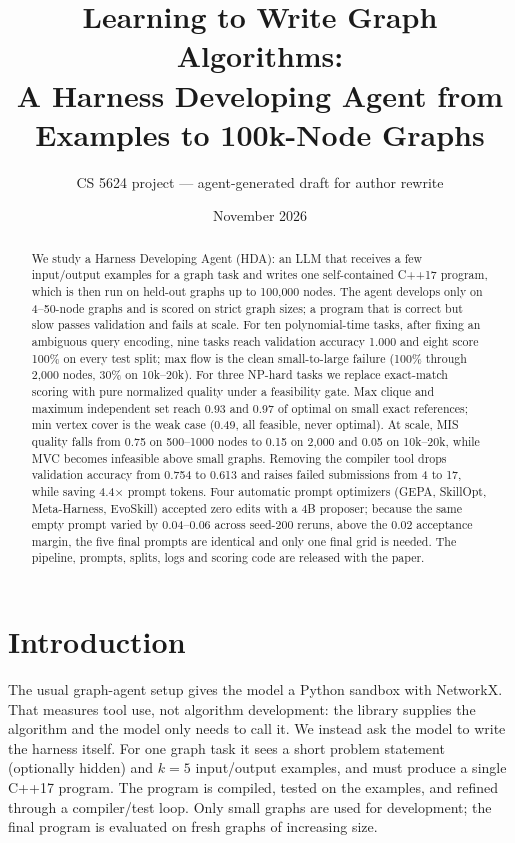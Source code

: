 \documentclass[10pt]{article}
\title{\vspace{-1.2em}Learning to Write Graph Algorithms:\\A Harness Developing Agent from Examples to 100k-Node Graphs}
\author{CS 5624 project --- agent-generated draft for author rewrite}
\date{November 2026}
\begin{document}
\maketitle
\thispagestyle{empty}

\begin{abstract}
We study a Harness Developing Agent (HDA): an LLM that receives a few
input/output examples for a graph task and writes one self-contained C++17
program, which is then run on held-out graphs up to 100{,}000 nodes. The agent
develops only on 4--50-node graphs and is scored on strict graph sizes; a
program that is correct but slow passes validation and fails at scale. For ten
polynomial-time tasks, after fixing an ambiguous query encoding, nine tasks
reach validation accuracy 1.000 and eight score 100\% on every test split; max
flow is the clean small-to-large failure (100\% through 2{,}000 nodes, 30\% on
10k--20k). For three NP-hard tasks we replace exact-match scoring with pure
normalized quality under a feasibility gate. Max clique and maximum independent
set reach 0.93 and 0.97 of optimal on small exact references; min vertex cover
is the weak case (0.49, all feasible, never optimal). At scale, MIS quality
falls from 0.75 on 500--1000 nodes to 0.15 on 2{,}000 and 0.05 on 10k--20k,
while MVC becomes infeasible above small graphs.
Removing the compiler tool drops validation accuracy from 0.754 to 0.613 and
raises failed submissions from 4 to 17, while saving 4.4$\times$ prompt tokens.
Four automatic prompt optimizers (GEPA, SkillOpt, Meta-Harness, EvoSkill)
accepted zero edits with a 4B proposer; because the same empty prompt varied by
0.04--0.06 across seed-200 reruns, above the 0.02 acceptance margin, the five
final prompts are identical and only one final grid is needed.
The pipeline, prompts, splits,
logs and scoring code are released with the paper.
\end{abstract}

\section{Introduction}
The usual graph-agent setup gives the model a Python sandbox with NetworkX.
That measures tool use, not algorithm development: the library supplies the
algorithm and the model only needs to call it. We instead ask the model to
write the harness itself. For one graph task it sees a short problem statement
(optionally hidden) and $k=5$ input/output examples, and must produce a single
C++17 program. The program is compiled, tested on the examples, and refined
through a compiler/test loop. Only small graphs are used for development; the
final program is evaluated on fresh graphs of increasing size.
\end{document}
